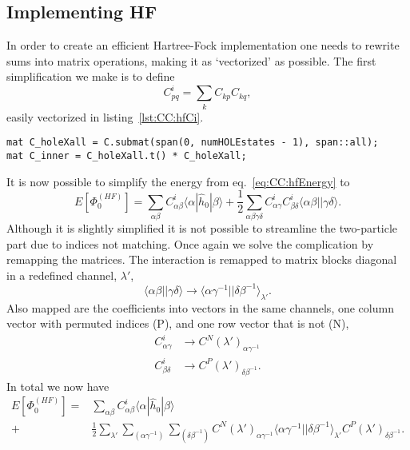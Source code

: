 \subsection{Implementing HF}
In order to create an efficient Hartree-Fock implementation one needs to rewrite sums into matrix operations, making it as `vectorized' as possible.
The first simplification we make is to define
\begin{equation}
C^{i}_{pq} = \sum_k C_{kp} C_{kq} ,
\end{equation}
easily vectorized in listing~\ref{lst:CC:hfCi}.
\begin{lstlisting}[float,label={lst:CC:hfCi},caption={Vectorized procedure to obtain $C^{i}$ (C\_inner).}]
mat C_holeXall = C.submat(span(0, numHOLEstates - 1), span::all);
mat C_inner = C_holeXall.t() * C_holeXall;
\end{lstlisting}
It is now possible to simplify the energy from eq.~\eqref{eq:CC:hfEnergy} to
\begin{equation}
E\left[\Phi_0^{(HF)}\right] 
=
\sum_{\alpha \beta} C^i_{\alpha\beta} \langle \alpha | \hat{h}_0 | \beta \rangle 
+
\frac{1}{2} \sum_{\alpha \beta \gamma \delta}
 C^i_{\alpha\gamma} C^i_{\beta\delta} \langle \alpha \beta || \gamma \delta \rangle .
\end{equation}
Although it is slightly simplified it is not possible to streamline the two-particle part due to indices not matching.
Once again we solve the complication by remapping the matrices.
The interaction is remapped to matrix blocks diagonal in a redefined channel, $\lambda'$,
\begin{equation}
\langle \alpha \beta || \gamma \delta \rangle
\rightarrow
\langle \alpha \gamma^{-1} || \delta \beta^{-1} \rangle_{\lambda'}.
\end{equation}
Also mapped are the coefficients into vectors in the same channels, one column vector with permuted indices (P), and one row vector that is not (N),
\begin{equation}
\label{eq:CC:mapHFcoeff}
\begin{split}
C^i_{\alpha \gamma} &\rightarrow C^{N}(\lambda')_{\alpha \gamma^{-1}}  \\
C^i_{\beta \delta} &\rightarrow C^{P}(\lambda')_{\delta \beta^{-1}} .
\end{split}
\end{equation}
In total we now have 
\begin{equation}
\label{eq:CC:hfEmatrixform}
\begin{split}
E\left[\Phi_0^{(HF)}\right] 
=&
\sum_{\alpha \beta} C^i_{\alpha\beta} \langle \alpha | \hat{h}_0 | \beta \rangle \\
+&
\frac{1}{2} \sum_{\lambda'} 
\sum_{(\alpha \gamma^{-1})}
\sum_{(\delta\beta^{-1})}
C^{N}(\lambda')_{\alpha \gamma^{-1}}
\langle \alpha \gamma^{-1} || \delta \beta^{-1} \rangle_{\lambda'}
C^{P}(\lambda')_{\delta \beta^{-1}}  .
\end{split}
\end{equation}

